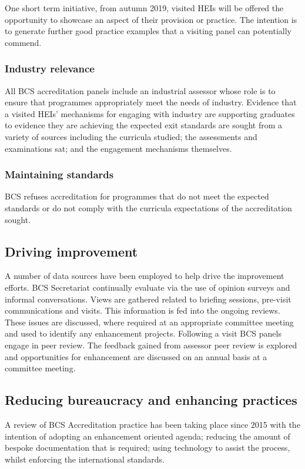 \documentclass[sigconf]{acmart}
\begin{document}
One short term initiative, from autumn 2019, visited HEIs will be offered the opportunity to showcase an aspect of their provision or practice. The intention is to generate further good practice examples that a visiting panel can potentially commend.

\subsubsection{Industry relevance}
All BCS accreditation panels include an industrial assessor whose role is to ensure that programmes appropriately meet the needs of industry. Evidence that a visited HEIs' mechanisms for engaging with industry are supporting graduates to evidence they are achieving the expected exit standards are sought from a variety of sources including the curricula studied; the assessments and examinations sat; and the engagement mechanisms themselves.

\subsubsection{Maintaining standards}
BCS refuses accreditation for programmes that do not meet the expected standards or do not comply with the curricula expectations of the accreditation sought.

\subsection{Driving improvement}
A number of data sources have been employed to help drive the improvement efforts. BCS Secretariat continually evaluate via the use of opinion surveys and informal conversations. Views are gathered related to briefing sessions, pre-visit communications and visits. This information is fed into the ongoing reviews. These issues are discussed, where required at an appropriate committee meeting and used to identify any enhancement projects. Following a visit BCS panels engage in peer review. The feedback gained from assessor peer review is explored and opportunities for enhancement are discussed on an annual basis at a committee meeting. 

\subsection{Reducing bureaucracy and enhancing practices}
A review of BCS Accreditation practice has been taking place since 2015 with the intention of adopting an enhancement oriented agenda; reducing the amount of bespoke documentation that is required; using technology to assist the process, whilst enforcing the international standards.
\end{document}
